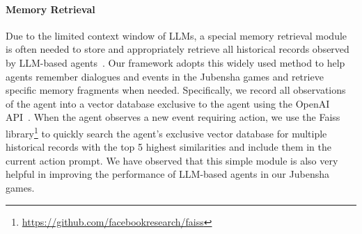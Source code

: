 \documentclass[11pt]{article}
\begin{document}
\paragraph{Memory Retrieval} 
Due to the limited context window of LLMs, a special memory retrieval module is often needed to store and appropriately retrieve all historical records observed by LLM-based agents~\cite{park2023generative,lai2023werewolf}. Our framework adopts this widely used method to help agents remember dialogues and events in the Jubensha games and retrieve specific memory fragments when needed. Specifically, we record all observations of the agent into a vector database exclusive to the agent using the OpenAI API~\cite{openaiEmbeddings}. When the agent observes a new event requiring action, we use the Faiss library\footnote{\url{https://github.com/facebookresearch/faiss}} to quickly search the agent's exclusive vector database for multiple historical records with the top 5 highest similarities and include them in the current action prompt. We have observed that this simple module is also very helpful in improving the performance of LLM-based agents in our Jubensha games.


\end{document}

